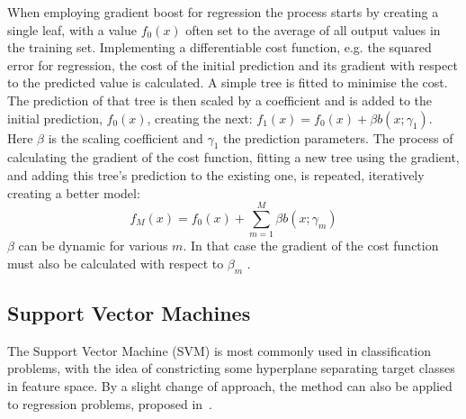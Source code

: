                 When employing gradient boost for regression the process starts by creating a single leaf, with a value $f_0(x)$ often set to the average of all output values in the training set. Implementing a differentiable cost function, e.g. the squared error for regression, the cost of the initial prediction and its gradient with respect to the predicted value is calculated. A simple tree is fitted to minimise the cost. The prediction of that tree is then scaled by a coefficient and is added to the initial prediction, $f_0(x)$, creating the next: $f_1(x) = f_0(x) + \beta b(x;\gamma_1)$. Here $\beta$ is the scaling coefficient and $\gamma_1$ the prediction parameters. The process of calculating the gradient of the cost function, fitting a new tree using the gradient, and adding this tree's prediction to the existing one, is repeated, iteratively creating a better model: 
                \begin{equation}
                    f_M(x) = f_0(x) + \sum_{m=1}^M \beta b(x; \gamma_m)
                \end{equation}
                $\beta$ can be dynamic for various $m$. In that case the gradient of the cost function must also be calculated with respect to $\beta_m$ \citep{hastie01statisticallearning}. 

        \subsection{Support Vector Machines}
            The Support Vector Machine (SVM) is most commonly used in classification problems, with the idea of constricting some hyperplane separating target classes in feature space. By a slight change of approach, the method can also be applied to regression problems, proposed in~\citep{SVR}. 
            

